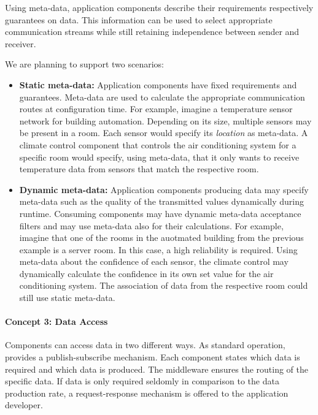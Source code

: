 	Using meta-data, application components describe their requirements respectively guarantees on data.
	This information can be used to select appropriate communication streams while still retaining independence between sender and receiver.
	
	We are planning to support two scenarios:
	\begin{itemize}
		\item \textbf{Static meta-data:}
			Application components have fixed requirements and guarantees.
			Meta-data are used to calculate the appropriate communication routes at configuration time.
			For example, imagine a temperature sensor network for building automation.
			Depending on its size, multiple sensors may be present in a room.
			Each sensor would specify its \emph{location} as meta-data.
			A climate control component that controls the air conditioning system for a specific room would specify, using meta-data,
			that it only wants to receive temperature data from sensors that match the respective room.
		
		\item \textbf{Dynamic meta-data:}
			Application components producing data may specify meta-data such as the quality of the transmitted values dynamically during runtime.
			Consuming components may have dynamic meta-data acceptance filters and may use meta-data also for their calculations.
			For example, imagine that one of the rooms in the auotmated building from the previous example is a server room.
			In this case, a high reliability is required.
			Using meta-data about the confidence of each sensor,
			the climate control may dynamically calculate the confidence in its own set value for the air conditioning system.
			The association of data from the respective room could still use static meta-data.
	\end{itemize}

\paragraph{Concept 3: Data Access}
Components can access data in two different ways. As standard operation, \xme provides a publish-subscribe mechanism. Each component states
which data is required and which data is produced. The middleware ensures the routing of the specific data. If data is only required 
seldomly in comparison to the data production rate, a request-response mechanism is offered to the application developer.

